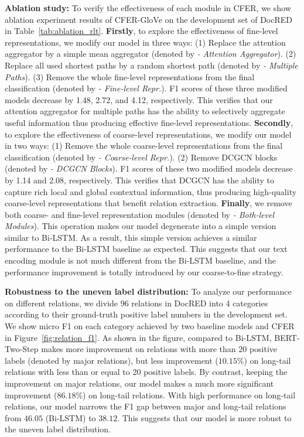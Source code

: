 \documentclass{article}
\begin{document}
\noindent\textbf{Ablation study: }
To verify the effectiveness of each module in CFER, we show ablation experiment results of CFER-GloVe on the development set of DocRED in Table~\ref{tab:ablation_rlt}. 
\textbf{Firstly}, to explore the effectiveness of fine-level representations, we modify our model in three ways: 
(1) Replace the attention aggregator by a simple mean aggregator (denoted by \textit{- Attention Aggregator}). 
(2) Replace all used shortest paths by a random shortest path (denoted by \textit{- Multiple Paths}). 
(3) Remove the whole fine-level representations from the final classification (denoted by \textit{- Fine-level Repr.}). 
F1 scores of these three modified models decrease by 1.48, 2.72, and 4.12, respectively. 
This verifies that our attention aggregator for multiple paths has the ability to selectively aggregate useful information thus producing effective fine-level representations. 
\textbf{Secondly}, to explore the effectiveness of coarse-level representations, we modify our model in two ways: 
(1) Remove the whole coarse-level representations from the final classification (denoted by \textit{-  Coarse-level Repr.}). 
(2) Remove DCGCN blocks (denoted by \textit{- DCGCN Blocks}). 
F1 scores of these two modified models decrease by 1.14 and 2.08, respectively. 
This verifies that DCGCN has the ability to capture rich local and global contextual information, thus producing high-quality coarse-level representations that benefit relation extraction. 
\textbf{Finally}, we remove both coarse- and fine-level representation modules (denoted by \textit{-  Both-level Modules}). 
This operation makes our model degenerate into a simple version similar to Bi-LSTM. 
As a result, this simple version achieves a similar performance to the Bi-LSTM baseline as expected. 
This suggests that our text encoding module is not much different from the Bi-LSTM baseline, and the performance improvement is totally introduced by our coarse-to-fine strategy. 

\noindent\textbf{Robustness to the uneven label distribution: }
To analyze our performance on different relations, we divide 96 relations in DocRED into 4 categories according to their ground-truth positive label numbers in the development set. 
We show micro F1 on each category achieved by two baseline models and CFER in Figure~\ref{fig:relation_f1}. 
As shown in the figure, compared to Bi-LSTM, BERT-Two-Step makes more improvement on relations with more than 20 positive labels (denoted by major relations), but less improvement ($10.15\%$) on long-tail relations with less than or equal to 20 positive labels. 
By contrast, keeping the improvement on major relations, our model makes a much more significant improvement ($86.18\%$) on long-tail relations. 
With high performance on long-tail relations, our model narrows the F1 gap between major and long-tail relations from $46.05$ (Bi-LSTM) to $38.12$. 
This suggests that our model is more robust to the uneven label distribution.
\end{document}
